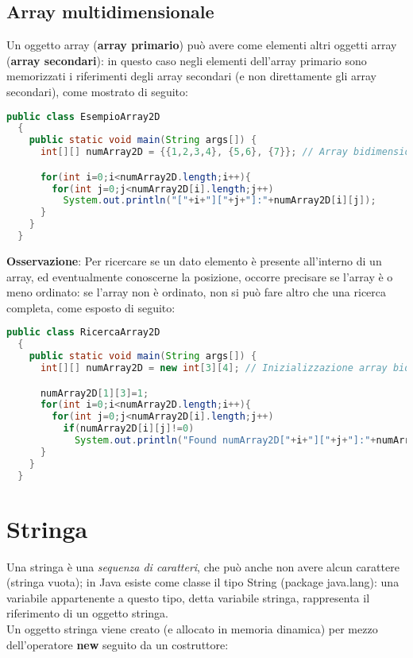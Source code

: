 \documentclass[a4paper]{extarticle}
\begin{document}
\subsection{Array multidimensionale}
Un oggetto array (\textbf{array primario}) può avere come elementi altri oggetti array (\textbf{array secondari}): in questo caso negli elementi dell’array primario sono memorizzati i riferimenti degli array secondari (e non direttamente gli array secondari), come mostrato di seguito:

\vspace{1em}
\noindent
\begin{lstlisting}[language=Java, caption=Array multidimensionale in Java]
  public class EsempioArray2D
  {
    public static void main(String args[]) {
      int[][] numArray2D = {{1,2,3,4}, {5,6}, {7}}; // Array bidimensionale

      for(int i=0;i<numArray2D.length;i++){
        for(int j=0;j<numArray2D[i].length;j++)
          System.out.println("["+i+"]["+j+"]:"+numArray2D[i][j]);
      }
    }
  }
\end{lstlisting}

\vspace{1em}
\noindent
\textbf{Osservazione}: Per ricercare se un dato elemento è presente all’interno di un array, ed eventualmente conoscerne la posizione, occorre precisare se l’array è o meno ordinato: se l’array non è ordinato, non si può fare altro che una ricerca completa, come esposto di seguito:

\vspace{1em}
\noindent
\begin{lstlisting}[language=Java, caption=Array multidimensionale in Java]
  public class RicercaArray2D
  {
    public static void main(String args[]) {
      int[][] numArray2D = new int[3][4]; // Inizializzazione array bidimensionale a 0

      numArray2D[1][3]=1;
      for(int i=0;i<numArray2D.length;i++){
        for(int j=0;j<numArray2D[i].length;j++)
          if(numArray2D[i][j]!=0)
            System.out.println("Found numArray2D["+i+"]["+j+"]:"+numArray2D[i][j]);
      }
    }
  }
\end{lstlisting}

\newpage
\section{Stringa}
Una stringa è una \emph{sequenza di caratteri}, che può anche non avere alcun carattere (stringa vuota); in Java esiste come classe il tipo String (package java.lang): una variabile appartenente a questo tipo, detta variabile stringa, rappresenta il riferimento di un oggetto stringa.\\
Un oggetto stringa viene creato (e allocato in memoria dinamica) per mezzo dell’operatore \textbf{new} seguito da un costruttore:
\end{document}
